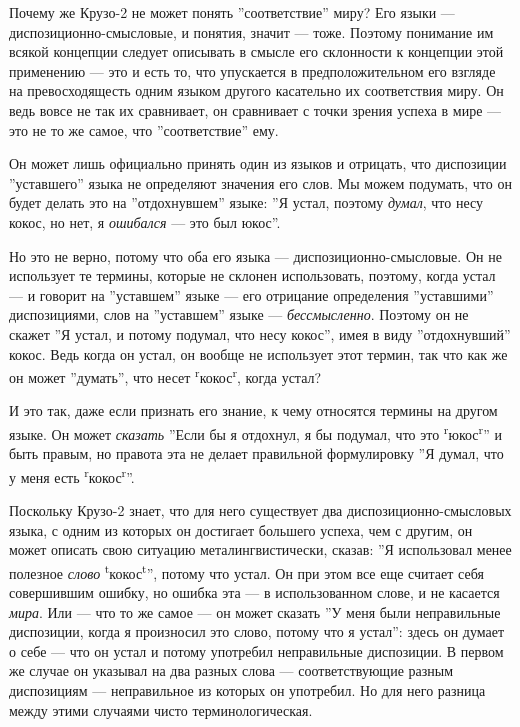 \documentclass[11pt]{book}
\begin{document}
Почему же Крузо-2 не может понять ''соответствие'' миру? Его языки --- диспозиционно-смысловые, и понятия, значит --- тоже. Поэтому понимание им всякой концепции следует описывать в смысле его склонности к концепции этой применению --- это и есть то, что упускается в предположительном его взгляде на превосходящесть одним языком другого касательно их соответствия миру. Он ведь вовсе не так их сравнивает, он сравнивает с точки зрения успеха в мире --- это не то же самое, что ''соответствие'' ему.

Он может лишь официально принять один из языков и отрицать, что диспозиции ''уставшего'' языка не определяют значения его слов. Мы можем подумать, что он будет делать это на ''отдохнувшем'' языке: ''Я устал, поэтому \textit{думал}, что несу кокос, но нет, я \textit{ошибался} --- это был юкос''.

Но это не верно, потому что оба его языка --- диспозиционно-смысловые. Он не использует те термины, которые не склонен использовать, поэтому, когда устал --- и говорит на ''уставшем'' языке --- его отрицание определения ''уставшими'' диспозициями, слов на ''уставшем'' языке --- \textit{бессмысленно}. Поэтому он не скажет ''Я устал, и потому подумал, что несу кокос'', имея в виду ''отдохнувший'' кокос. Ведь когда он устал, он вообще не использует этот термин, так что как же он может ''думать'', что несет \textsuperscript{r}кокос\textsuperscript{r}, когда устал?

И это так, даже если признать его знание, к чему относятся термины на другом языке. Он может \textit{сказать} ''Если бы я отдохнул, я бы подумал, что это \textsuperscript{r}юкос\textsuperscript{r}'' и быть правым, но правота эта не делает правильной формулировку ''Я думал, что у меня есть \textsuperscript{r}кокос\textsuperscript{r}''.

Поскольку Крузо-2 знает, что для него существует два диспозиционно-смысловых языка, с одним из которых он достигает большего успеха, чем с другим, он может описать свою ситуацию металингвистически, сказав: ''Я использовал менее полезное \textit{слово} \textsuperscript{t}кокос\textsuperscript{t}'', потому что устал. Он при этом все еще считает себя совершившим ошибку, но ошибка эта --- в использованном слове, и не касается \textit{мира}. Или --- что то же самое --- он может сказать ''У меня были неправильные диспозиции, когда я произносил это слово, потому что я устал'': здесь он думает о себе --- что он устал и потому употребил неправильные диспозиции. В первом же случае он указывал на два разных слова --- соответствующие разным диспозициям --- неправильное из которых он употребил. Но для него разница между этими случаями чисто терминологическая.
\end{document}
